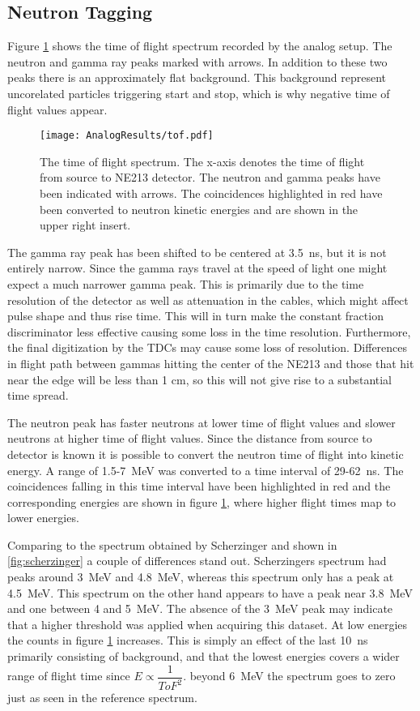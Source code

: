 \documentclass[main.tex]{subfiles}
\begin{document}
\subsection{Neutron Tagging}
Figure \ref{fig:tof_a} shows the time of flight spectrum recorded by the analog setup. The neutron and gamma ray peaks marked with arrows. In addition to these two peaks there is an approximately flat background. This background represent uncorelated particles triggering start and stop, which is why negative time of flight values appear.
\begin{figure}[ht]
    \centering
        \texttt{[image: AnalogResults/tof.pdf]}
        \caption[Time of flight spectrum, analog setup.]{The time of flight spectrum. The x-axis denotes the time of flight from source to NE213 detector. The neutron and gamma peaks have been indicated with arrows. The coincidences highlighted in red have been converted to neutron kinetic energies and are shown in the upper right insert.}
    \label{fig:tof_a}
\end{figure}

The gamma ray peak has been shifted to be centered at \SI{3.5}{ns}, but it is not entirely narrow. Since the gamma rays travel at the speed of light one might expect a much narrower gamma peak. This is primarily due to the time resolution of the detector as well as attenuation in the cables, which might affect pulse shape and thus rise time. This will in turn make the constant fraction discriminator less effective causing some loss in the time resolution. Furthermore, the final  digitization by the TDCs may cause some loss of resolution. Differences in flight path between gammas hitting the center of the NE213 and those that hit near the edge will be less than 1 cm, so this will not give rise to a substantial time spread. 

The neutron peak has faster neutrons at lower time of flight values and slower neutrons at higher time of flight values. Since the distance from source to detector is known it is possible to convert the neutron time of flight into kinetic energy. A range of 1.5-\SI{7}{\MeV} was converted to a time interval of 29-\SI{62}{\ns}. The coincidences falling in this time interval have been highlighted in red and the corresponding energies are shown in figure \ref{fig:tof_a}, where higher flight times map to lower energies.

Comparing to the spectrum obtained by Scherzinger\cite{ScherzingerPhd} and shown in \ref{fig:scherzinger} a couple of differences stand out. Scherzingers spectrum had peaks around \SI{3}{\MeV} and \SI{4.8}{\MeV}, whereas this spectrum only has a peak at \SI{4.5}{\MeV}. This spectrum on the other hand appears to have a peak near \SI{3.8}{\MeV} and one between 4 and \SI{5}{\MeV}. The absence of the \SI{3}{\MeV} peak may indicate that a higher threshold was applied when acquiring this dataset. At low energies the counts in figure \ref{fig:tof_a} increases. This is simply an effect of the last \SI{10}{\ns} primarily consisting of background, and that the lowest energies covers a wider range of flight time since $E\propto \dfrac{1}{ToF^2}$. beyond \SI{6}{\MeV} the spectrum goes to zero just as seen in the reference spectrum.
\end{document}

